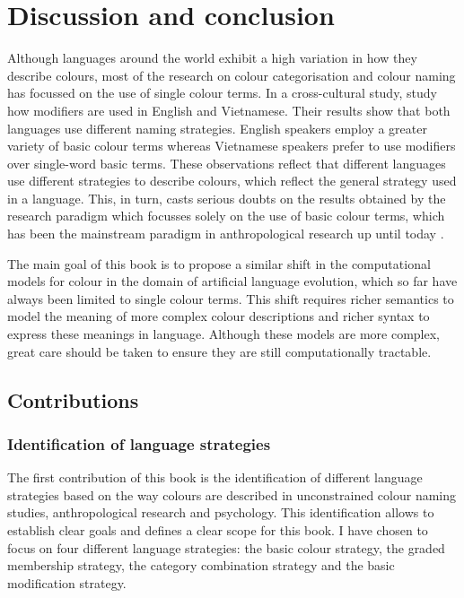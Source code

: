 \chapter{Discussion and conclusion}
\label{s:conclusion}

Although languages around the world exhibit a high variation in how
they describe colours, most of the research on colour categorisation
and colour naming has focussed on the use of single colour terms. In a
cross-cultural study, \cite{alvarado02modifying} study how modifiers
are used in English and Vietnamese. Their results show that both
languages use different naming strategies. English speakers employ a
greater variety of basic colour terms whereas Vietnamese speakers
prefer to use modifiers over single-word basic terms. These
observations reflect that different languages use different strategies 
to describe colours, which reflect the general strategy used in a language.
This, in turn, casts serious doubts on the results obtained by
the research paradigm which focusses solely on the use of basic colour
terms, which has been the mainstream paradigm in anthropological
research up until today \citep{kay10world}.

The main goal of this book is to propose a similar shift in the
computational models for colour in the domain of artificial language
evolution, which so far have always been limited to single colour terms. This
shift requires richer semantics to model the meaning of more complex
colour descriptions and richer syntax to express these meanings in
language. Although these models are more complex, great care 
should be taken to ensure they are still computationally tractable.

\section{Contributions}
\label{s:contributions}

\subsection{Identification of language strategies}

The first contribution of this book is the identification of
different language strat\-egies based on the way colours are described
in unconstrained colour naming studies, anthropological research and
psychology. This identification allows to establish clear goals and
defines a clear scope for this book. I have chosen to focus on four
different language strategies: the basic colour strategy, the
graded membership strategy, the category combination
  strategy and the basic modification strategy.


